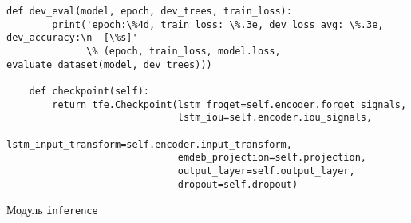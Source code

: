 \begin{lstlisting}[style=app]
    def dev_eval(model, epoch, dev_trees, train_loss):
        print('epoch:\%4d, train_loss: \%.3e, dev_loss_avg: \%.3e, dev_accuracy:\n  [\%s]'
              \% (epoch, train_loss, model.loss, evaluate_dataset(model, dev_trees)))

    def checkpoint(self):
        return tfe.Checkpoint(lstm_froget=self.encoder.forget_signals,
                              lstm_iou=self.encoder.iou_signals,
                              lstm_input_transform=self.encoder.input_transform,
                              emdeb_projection=self.projection,
                              output_layer=self.output_layer,
                              dropout=self.dropout)

\end{lstlisting}

\begin{center}Модуль \texttt{inference}\end{center}
